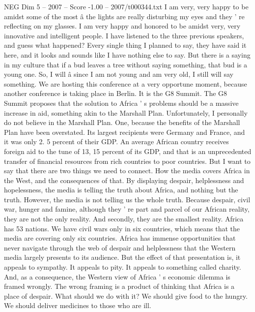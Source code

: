 \begin{textsample}{NEG Dim 5 – 2007 – Score -1.00 – 2007/t000344.txt}  \label{ex:f5_neg_055}
I am very, very happy to be amidst some of the most â the lights are really disturbing my eyes and they ' re reflecting on my glasses.
I am very happy and honored to be amidst very, very innovative and intelligent people.
I have listened to the three previous speakers, and guess what happened?
Every single thing I planned to say, they have said it here, and it looks and sounds like I have nothing else to say.
But there is a saying in my culture that if a bud leaves a tree without saying something, that bud is a young one.
So, I will â since I am not young and am very old, I still will say something.
We are hosting this conference at a very opportune moment, because another conference is taking place in Berlin.
It is the G8 Summit.
The G8 Summit proposes that the solution to Africa ' s problems should be a massive increase in aid, something akin to the Marshall Plan.
Unfortunately, I personally do not believe in the Marshall Plan.
One, because the benefits of the Marshall Plan have been overstated.
Its largest recipients were Germany and France, and it was only 2. 5 percent of their GDP.
An average African country receives foreign aid to the tune of 13, 15 percent of its GDP, and that is an unprecedented transfer of financial resources from rich countries to poor countries.
But I want to say that there are two things we need to connect.
How the media covers Africa in the West, and the consequences of that.
By displaying despair, helplessness and hopelessness, the media is telling the truth about Africa, and nothing but the truth.
However, the media is not telling us the whole truth.
Because despair, civil war, hunger and famine, although they ' re part and parcel of our African reality, they are not the only reality.
And secondly, they are the smallest reality.
Africa has 53 nations.
We have civil wars only in six countries, which means that the media are covering only six countries.
Africa has immense opportunities that never navigate through the web of despair and helplessness that the Western media largely presents to its audience.
But the effect of that presentation is, it appeals to sympathy.
It appeals to pity.
It appeals to something called charity.
And, as a consequence, the Western view of Africa ' s economic dilemma is framed wrongly.
The wrong framing is a product of thinking that Africa is a place of despair.
What should we do with it?
We should give food to the hungry.
We should deliver medicines to those who are ill.

\end{textsample}

